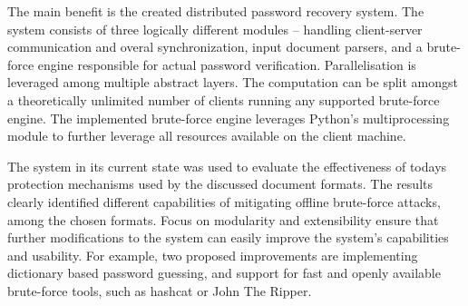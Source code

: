 \documentclass[11pt,oneside]{fithesis2}
\begin{document}
The main benefit is the created distributed password recovery system. The system consists of three logically different modules -- handling client-server communication and overal synchronization, input document parsers, and a brute-force engine responsible for actual password verification. Parallelisation is leveraged among multiple abstract layers. The computation can be split amongst a theoretically unlimited number of clients running any supported brute-force engine. The implemented brute-force engine leverages Python's multiprocessing module to further leverage all resources available on the client machine. 

The system in its current state was used to evaluate the effectiveness of todays protection mechanisms used by the discussed document formats. The results clearly identified different capabilities of mitigating offline brute-force attacks, among the chosen formats. Focus on modularity and extensibility ensure that further modifications to the system can easily improve the system's capabilities and usability. For example, two proposed improvements are implementing dictionary based password guessing, and support for fast and openly available brute-force tools, such as hashcat or John The Ripper.

 

\end{document}

